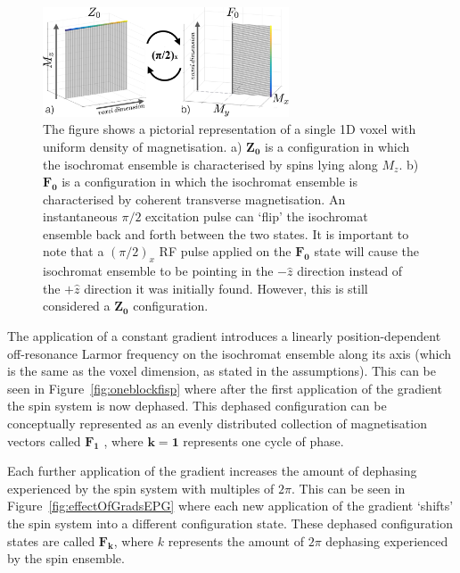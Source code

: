 \begin{figure}[ht]
    \centering
    \includegraphics[angle=0,width=0.65\textwidth, keepaspectratio]{images/mrf/Z0F0states}
    \caption{The figure shows a pictorial representation of a single 1D voxel with uniform density of magnetisation.
    a) $\bm{Z_0}$ is a configuration in which the isochromat ensemble is characterised by spins lying along $M_z$.
    b) $\bm{F_0}$ is a configuration in which the isochromat ensemble is characterised by coherent transverse magnetisation.
    An instantaneous $\pi/2$ excitation pulse can `flip' the isochromat ensemble back and forth between the two states.
    It is important to note that a $(\pi/2)_x$ RF pulse applied on the $\bm{F_0}$ state will cause the isochromat ensemble to be pointing in the $- \hat{z}$ direction instead of the $+ \hat{z}$ direction it was initially found.
    However, this is still considered a $\bm{Z_0}$ configuration.
    }
    \label{fig:Z0F0states}
\end{figure}

The application of a constant gradient introduces a linearly position-dependent off-resonance Larmor frequency on the isochromat ensemble along its axis (which is the same as the voxel dimension, as stated in the assumptions).
This can be seen in Figure~\ref{fig:oneblockfisp} where after the first application of the gradient the spin system is now dephased.
This dephased configuration can be conceptually represented as an evenly distributed collection of magnetisation vectors called $\bm{F_1}$ \cite{Hennig1988} \cite{Scheffler1999}, where $\bm{k=1}$ represents one cycle of phase.

\hfill

Each further application of the gradient increases the amount of dephasing experienced by the spin system with multiples of $2\pi$.
This can be seen in Figure~\ref{fig:effectOfGradsEPG} where each new application of the gradient `shifts' the spin system into a different configuration state.
These dephased configuration states are called $\bm{F_k}$, where $k$ represents the amount of $2\pi$ dephasing experienced by the spin ensemble.

